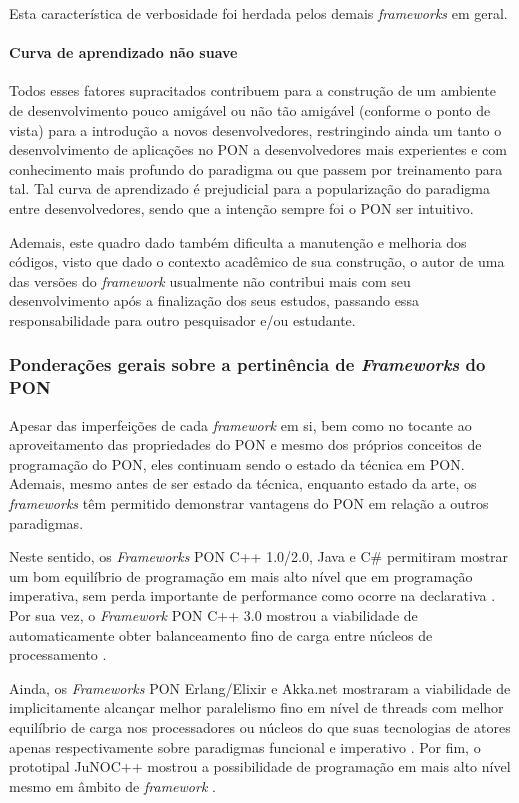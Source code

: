 Esta característica de verbosidade foi herdada pelos demais \textit{frameworks}
em geral.

\paragraph*{Curva de aprendizado não suave}

Todos esses fatores supracitados contribuem para a construção de um ambiente de
desenvolvimento pouco amigável ou não tão amigável (conforme o ponto de vista)
para a introdução a novos desenvolvedores, restringindo ainda um tanto o
desenvolvimento de aplicações no PON a desenvolvedores mais experientes e com
conhecimento mais profundo do paradigma ou que passem por treinamento para tal.
Tal curva de aprendizado é prejudicial para a popularização do paradigma entre
desenvolvedores, sendo que a intenção sempre foi o PON ser intuitivo.

Ademais, este quadro dado também dificulta a manutenção e melhoria dos códigos,
visto que dado o contexto acadêmico de sua construção, o autor de uma das
versões do \textit{framework} usualmente não contribui mais com seu
desenvolvimento após a finalização dos seus estudos, passando essa
responsabilidade para outro pesquisador e/ou estudante.

\subsubsection{Ponderações gerais sobre a pertinência de \textit{Frameworks} do PON}

Apesar das imperfeições de cada \textit{framework} em si, bem como no tocante ao
aproveitamento das propriedades do PON e mesmo dos próprios conceitos de
programação do PON, eles continuam sendo o estado da técnica em PON. Ademais,
mesmo antes de ser estado da técnica, enquanto estado da arte, os
\textit{frameworks} têm permitido demonstrar vantagens do PON em relação a outros
paradigmas. 

Neste sentido, os \textit{Frameworks} PON C++ 1.0/2.0, Java e C\# permitiram
mostrar um bom equilíbrio de programação em mais alto nível que em programação
imperativa, sem perda importante de performance como ocorre na declarativa
\cite{msc_Banaszewski_2009,henzen_2015,ronszcka_2017}. Por sua vez, o
\textit{Framework} PON C++ 3.0 mostrou a viabilidade de automaticamente obter
balanceamento fino de carga entre núcleos de processamento
\cite{belmonte_2012,belmonte_2016}. 

Ainda, os \textit{Frameworks} PON Erlang/Elixir e Akka.net mostraram a
viabilidade de implicitamente alcançar melhor paralelismo fino em nível de
threads com melhor equilíbrio de carga nos processadores ou núcleos do que suas
tecnologias de atores apenas respectivamente sobre paradigmas funcional e
imperativo \cite{martini_2019,msc_negrini_2019}. Por fim, o prototipal JuNOC++
mostrou a possibilidade de programação em mais alto nível mesmo em âmbito de
\textit{framework} \cite{chierichi_2020}. 

